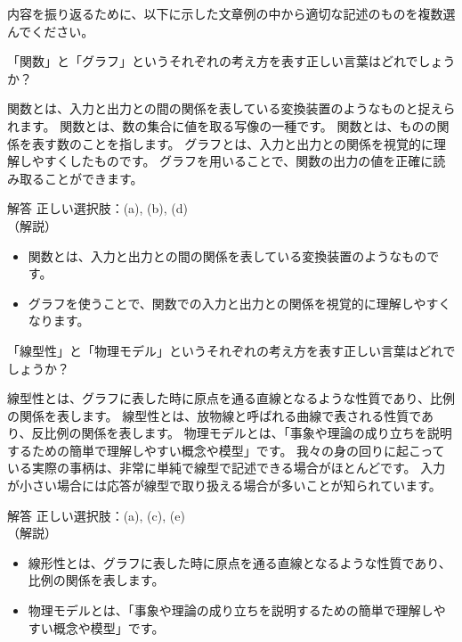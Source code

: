 \documentclass[uplatex,dvipdfmx,a4paper,11pt]{jsarticle}
\begin{document}
内容を振り返るために、以下に示した文章例の中から適切な記述のものを複数選んでください。
\begin{qlist}
	\qitem 「関数」と「グラフ」というそれぞれの考え方を表す正しい言葉はどれでしょうか？
		\begin{qlist2}
			\qitem 関数とは、入力と出力との間の関係を表している変換装置のようなものと捉えられます。
			\qitem 関数とは、数の集合に値を取る写像の一種です。
			\qitem 関数とは、ものの関係を表す数のことを指します。
			\qitem グラフとは、入力と出力との関係を視覚的に理解しやすくしたものです。
			\qitem グラフを用いることで、関数の出力の値を正確に読み取ることができます。
		\end{qlist2}
    \vspace{3mm}
    \begin{itembox}[l]{解答}
        正しい選択肢：(a), (b), (d)\\
        （解説）
        \begin{itemize}
          \item 関数とは、入力と出力との間の関係を表している変換装置のようなものです。
          \item グラフを使うことで、関数での入力と出力との関係を視覚的に理解しやすくなります。
        \end{itemize}
    \end{itembox}
	\qitem 「線型性」と「物理モデル」というそれぞれの考え方を表す正しい言葉はどれでしょうか？
		\begin{qlist2}
			\qitem 線型性とは、グラフに表した時に原点を通る直線となるような性質であり、比例の関係を表します。
			\qitem 線型性とは、放物線と呼ばれる曲線で表される性質であり、反比例の関係を表します。
			\qitem 物理モデルとは、「事象や理論の成り立ちを説明するための簡単で理解しやすい概念や模型」です。
			\qitem 我々の身の回りに起こっている実際の事柄は、非常に単純で線型で記述できる場合がほとんどです。
			\qitem 入力が小さい場合には応答が線型で取り扱える場合が多いことが知られています。
    \end{qlist2}
    \vspace{3mm}
    \begin{itembox}[l]{解答}
        正しい選択肢：(a), (c), (e)\\
        （解説）
        \begin{itemize}
          \item 線形性とは、グラフに表した時に原点を通る直線となるような性質であり、比例の関係を表します。
          \item 物理モデルとは、「事象や理論の成り立ちを説明するための簡単で理解しやすい概念や模型」です。

\end{itemize}
\end{itembox}
\end{qlist}
\end{document}
